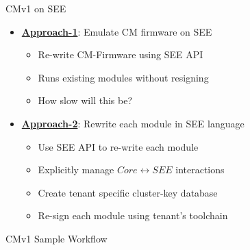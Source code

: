 \documentclass[handout,xcolor=svgnames]{beamer}
\newcommand{\hicolor}{darkorange}
\newcommand{\imp}[1]{\begin{center}\Large{\color{\hicolor}{#1}}\end{center}}
\newcommand{\pointout}[1]{{\underline{\textbf{#1}}}}
\begin{document}
\begin{frame}
  {CMv1 on SEE}

  \begin{itemize}
      \item \pointout{Approach-1}: Emulate CM firmware on SEE
      \begin{itemize}
          \item Re-write CM-Firmware using SEE API
          \item Runs existing modules without resigning
          \item How slow will this be?
      \end{itemize}
      \item \pointout{Approach-2}: Rewrite each module in SEE language
      \begin{itemize}
          \item Use SEE API to re-write each module
          \item Explicitly manage $Core \leftrightarrow SEE$ interactions
          \item Create tenant specific cluster-key database
          \item Re-sign each module using tenant's toolchain
      \end{itemize}
      \end{itemize}
\end{frame}

\begin{frame}{CMv1 Sample Workflow}
    \imp{White board!}
\end{frame}
\end{document}
